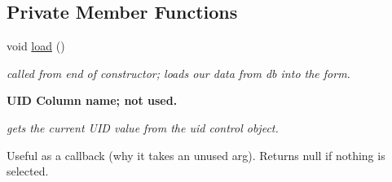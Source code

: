 \subsection*{Private Member Functions}
\begin{DoxyCompactItemize}
\item 
void \hyperlink{class_ias_pbx_config_1_1_trunk_details_a2dd1283dc843a19b6d5cc13e957c322b}{load} ()
\begin{DoxyCompactList}\small\item\em called from end of constructor; loads our data from db into the form. \item\end{DoxyCompactList}\end{DoxyCompactItemize}
\begin{Indent}{\bf UID Column name; not used.}\par
{\em \label{_amgrpa96719e2db7e8ae9bacb77b8181e3f53}
gets the current UID value from the uid control object.

Useful as a callback (why it takes an unused arg). Returns null if nothing is selected.

}
\end{Indent}
